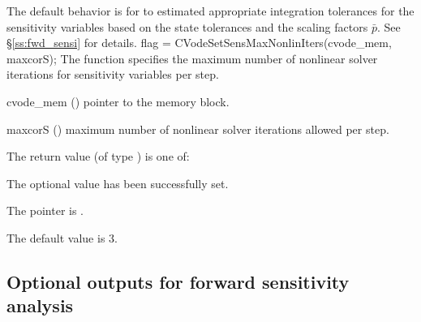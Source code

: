 {
  The default behavior is for  {\cvodes} to estimated appropriate integration 
  tolerances for the sensitivity variables based on the state tolerances and
  the scaling factors ${\bar p}$. See \S\ref{ss:fwd_sensi} for details.
}
{
  flag = CVodeSetSensMaxNonlinIters(cvode\_mem, maxcorS);
}
{
  The function  specifies the maximum
  number of nonlinear solver iterations for sensitivity variables per step.
}
{
  \begin{args}
  \item[cvode\_mem] ()
    pointer to the {\cvodes} memory block.
  \item[maxcorS] ()
    maximum number of nonlinear solver iterations allowed per step.
  \end{args}
}
{
  The return value  (of type ) is one of:
  \begin{args}
  \item[\Id{CV\_SUCCESS}] 
    The optional value has been successfully set.
  \item[\Id{CV\_MEM\_NULL}]
    The  pointer is .
  \end{args}
}
{
  The default value is $3$.
}

\subsection{Optional outputs for forward sensitivity analysis}
\label{ss:sens_optional_output}

